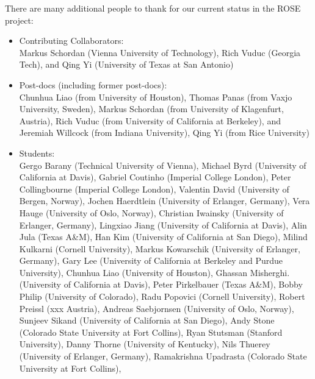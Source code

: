      There are many additional people to thank for our current status in 
the ROSE project:
\begin{itemize}
     \item Contributing Collaborators: \\
           Markus Schordan (Vienna University of Technology),
           Rich Vuduc (Georgia Tech), and
           Qing Yi (University of Texas at San Antonio)

     \item Post-docs (including former post-docs): \\
           Chunhua Liao (from University of Houston),
           Thomas Panas (from Vaxjo University, Sweden),
           Markus Schordan (from University of Klagenfurt, Austria),
           Rich Vuduc (from University of California at Berkeley), and
           Jeremiah Willcock (from Indiana University),
           Qing Yi (from Rice University)
     \item Students: \\
           Gergo Barany (Technical University of Vienna),
           Michael Byrd (University of California at Davis),
           Gabriel Coutinho (Imperial College London),
           Peter Collingbourne (Imperial College London),
           Valentin David (University of Bergen, Norway),
           Jochen Haerdtlein (University of Erlanger, Germany),
           Vera Hauge (University of Oslo, Norway),
           Christian Iwainsky (University of Erlanger, Germany),
           Lingxiao Jiang (University of California at Davis),
           Alin Jula (Texas A\&M),
           Han Kim (University of California at San Diego),
           Milind Kulkarni (Cornell University),
           Markus Kowarschik (University of Erlanger, Germany),
           Gary Lee (University of California at Berkeley and Purdue University),
           Chunhua Liao (University of Houston),
           Ghassan Misherghi. (University of California at Davis),
           Peter Pirkelbauer (Texas A\&M),
           Bobby Philip (University of Colorado),
           Radu Popovici (Cornell University),
           Robert Preissl (xxx Austria),
           Andreas Saebjornsen (University of Oslo, Norway),
           Sunjeev Sikand (University of California at San Diego),
           Andy Stone (Colorado State University at Fort Collins),
           Ryan Stutsman (Stanford University),
           Danny Thorne (University of Kentucky), 
           Nils Thuerey (University of Erlanger, Germany), 
           Ramakrishna Upadrasta (Colorado State University at Fort Collins),

\end{itemize}
